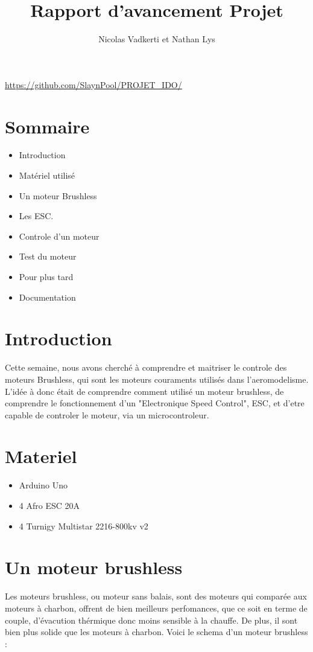 \documentclass[10pt,a4paper]{article}
\title{Rapport d'avancement Projet}
\author{Nicolas Vadkerti et Nathan Lys}
\begin{document}
\maketitle


\url{https://github.com/SlaynPool/PROJET_IDO/}
\section{Sommaire}
\begin{itemize}
\item Introduction
\item Matériel utilisé
\item Un moteur Brushless
\item Les ESC.
\item Controle d'un moteur
\item Test du moteur
\item Pour plus tard
\item Documentation
\end{itemize}
\section{Introduction}
Cette semaine, nous avons cherché à comprendre et maitriser le controle des moteurs Brushless, qui sont les moteurs couraments utilisés dans l'aeromodelisme. L'idée à donc était de comprendre comment utilisé un moteur brushless, de comprendre le fonctionnement d'un "Electronique Speed Control", ESC, et d'etre capable de controler le moteur, via un microcontroleur.
\section{ Materiel}
\begin{itemize}
 \item Arduino Uno
 \item 4 Afro ESC 20A
 \item 4 Turnigy Multistar 2216-800kv v2
 
\end{itemize}
\section{ Un moteur brushless}
Les moteurs brushless, ou moteur sans balais, sont des moteurs qui comparée aux moteurs à charbon, offrent de bien meilleurs perfomances, que ce soit en terme de couple, d'évacution thérmique donc moins sensible à la chauffe. De plus, il sont bien plus solide que les moteurs à charbon. Voici le schema d'un moteur brushless : 
\end{document}
